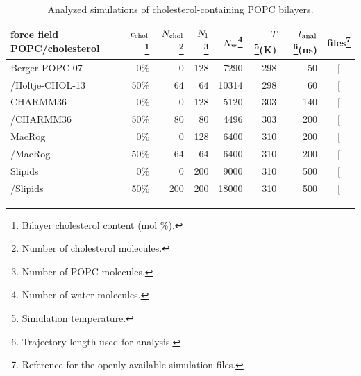 \documentclass[journal=jpcbfk,manuscript=article,layout=twocolumn]{achemso}
\begin{document}
\begin{table}[]
\caption{Analyzed simulations of cholesterol-containing POPC bilayers.}
\begin{minipage}[t]{\columnwidth}
\resizebox{\columnwidth}{!} {
\begin{tabular}{lrrrrrrc}
force field POPC/cholesterol &
$c_{{\rm chol}}$\footnote{Bilayer cholesterol content (mol \%).}  &
$N_{\rm chol}$\footnote{Number of cholesterol molecules.}  &
$N_{\rm l}$\footnote{Number of POPC molecules.} &
$N_{\rm w}$\footnote{Number of water molecules.}  &
$T$\footnote{Simulation temperature.}(K) &
$t_{{\rm anal}}$\footnote{Trajectory length used for analysis.}(ns) &
files\footnote{Reference for the openly available simulation files.} 
\tabularnewline
\hline 
Berger-POPC-07~\cite{ollila07a}
	& 0\%	& 0	& 128	& 7290  & 298  & 50 & {[}\!\!\citenum{bergerFILESpopc}{]} \tabularnewline
/H\"{o}ltje-CHOL-13~\cite{holtje01,ferreira13} 
	& 50\%	& 64	& 64		& 10314  & 298  & 60  & {[}\!\!\citenum{bergerFILESpopc50chol}{]} \tabularnewline[1.0ex]
CHARMM36~\cite{klauda10} 
	& 0\%	& 0 	& 128 	& 5120  & 303  & 140  & {[}\!\!\citenum{charmm36files}{]} \tabularnewline
/CHARMM36~\cite{lim12} 
 	& 50\%	& 80	& 80		& 4496  & 303  & 200  & {[}\!\!\citenum{charmm36files50perCHOL}{]} \tabularnewline[1.0ex]
MacRog~\cite{kulig15}
	& 0\%	& 0	& 128	& 6400  & 310  & 200  & {[}\!\!\citenum{macrogCHOLfiles}{]} \tabularnewline
/MacRog~\cite{kulig15}
 	& 50\%	& 64	& 64		& 6400  & 310  & 200  & {[}\!\!\citenum{macrogCHOLfiles}{]} \tabularnewline[1.0ex]
Slipids~\cite{jambeck12b}
	& 0\%	& 0	& 200	& 9000 & 310 & 500  & {[}\!\!\citenum{slipidsFILESpopcchol}{]} \tabularnewline
/Slipids~\cite{jambeck13chol}
 	& 50\%	&200& 200	& 18000 & 310 & 500 & {[}\!\!\citenum{slipidsFILESpopcchol}{]}\tabularnewline
\end{tabular}
}
\end{minipage}
\label{tab:chol}
\end{table}
\end{document}
